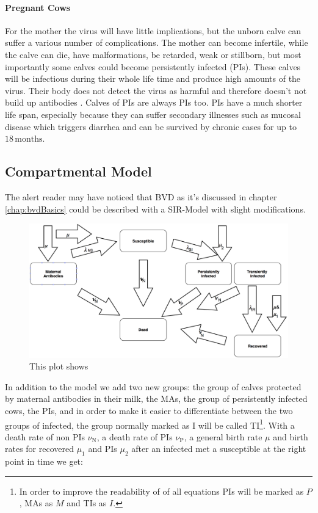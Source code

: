 \paragraph{Pregnant Cows}
For the mother the virus will have little implications, but the unborn calve can suffer a various number of complications. The mother can become infertile, while the calve can die, have malformations, be retarded, weak or stillborn, but most importantly some calves could become persistently infected (PIs). These calves will be infectious during their whole life time and produce high amounts of the virus. Their body does not detect the virus as harmful and therefore doesn't not build up antibodies \citep{personalCom}. Calves of PIs are always PIs too. PIs have a much shorter life span, especially because they can suffer secondary illnesses such as mucosal disease which triggers diarrhea and can be survived by chronic cases for up to $18\,\text{months}$.

\subsection{Compartmental Model}
The alert reader may have noticed that BVD as it's discussed in chapter \ref{chap:bvdBasics} could be described with a SIR-Model with slight modifications. 
\begin{figure}[htbp]
\centering
\noindent\includegraphics[width=\linewidth,height=\textheight,
keepaspectratio]{bvdDia.png} \caption[]{This plot shows }
\label{fig:bvdDia}
\end{figure}
In addition to the model we add two new groups: the group of calves protected by maternal antibodies in their milk, the MAs, the group of persistently infected cows, the PIs, and in order to make it easier to differentiate between the two groups of infected, the group normally marked as I will be called TI\footnote{In order to improve the readability of of all equations PIs will be marked as $P$, MAs as $M$ and TIs as $I$.}.
 With a death rate of non PIs $\nu_\text{N}$, a death rate of PIs $\nu_\text{P}$, a general birth rate $\mu$ and birth rates for recovered $\mu_1$ and PIs $\mu_2$ after an infected met a susceptible at the right point in time we get:

